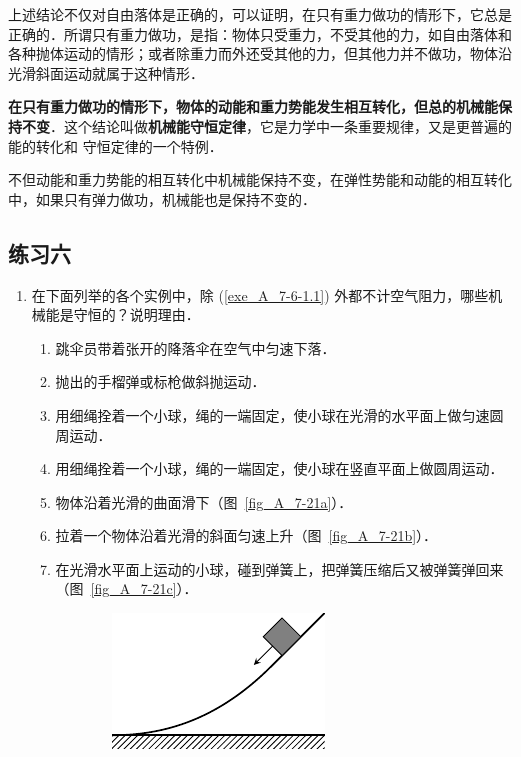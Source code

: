 上述结论不仅对自由落体是正确的，可以证明，在只有重力做功的情形下，它总是正确的．所谓只有重力做功，是指：物体只受重力，不受其他的力，如自由落体和各种抛体运动的情形；或者除重力而外还受其他的力，但其他力并不做功，物体沿光滑斜面运动就属于这种情形．

\textbf{在只有重力做功的情形下，物体的动能和重力势能发生相互转化，但总的机械能保持不变}．这个结论叫做\textbf{机械能守恒定律}，它是力学中一条重要规律，又是更普遍的能的转化和
守恒定律的一个特例．

不但动能和重力势能的相互转化中机械能保持不变，在弹性势能和动能的相互转化中，如果只有弹力做功，机械能也是保持不变的．

\subsection*{练习六}
\begin{enumerate}
    \item 在下面列举的各个实例中，除 (\ref{exe_A_7-6-1.1}) 外都不计空气阻力，哪些机械能是守恒的？说明理由．
    \begin{enumerate}
        \item \label{exe_A_7-6-1.1} 跳伞员带着张开的降落伞在空气中匀速下落．
        \item 抛出的手榴弹或标枪做斜抛运动．
        \item 用细绳拴着一个小球，绳的一端固定，使小球在光滑的水平面上做匀速圆周运动．
        \item 用细绳拴着一个小球，绳的一端固定，使小球在竖直平面上做圆周运动．
        \item 物体沿着光滑的曲面滑下（图~\ref{fig_A_7-21a}）．
        \item 拉着一个物体沿着光滑的斜面匀速上升（图~\ref{fig_A_7-21b}）．
        \item 在光滑水平面上运动的小球，碰到弹簧上，把弹簧压缩后又被弹簧弹回来（图~\ref{fig_A_7-21c}）．
    \end{enumerate}
\begin{figure}[htbp]
    \centering
    \begin{subfigure} {0.3\linewidth} 
        \centering
        \includegraphics{fig/A/7-21a.pdf} 

\end{subfigure}
\end{figure}
\end{enumerate}
